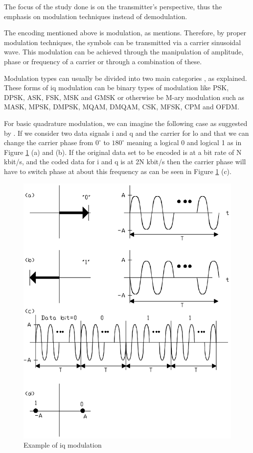 \par The focus of the study done is on the transmitter's perspective, thus the emphasis on modulation techniques instead of demodulation.

\par The encoding mentioned above is modulation, as \cite{Ha2010TheorySystems} mentions. Therefore, by proper modulation techniques, the symbols can be transmitted via a carrier sinusoidal wave. This modulation can be achieved through the manipulation of amplitude, phase or frequency of a carrier or through a combination of these.

\par Modulation types can usually be divided into two main categories \cite{Ha2010TheorySystems}, as explained. These forms of \ac{iq} modulation can be binary types of modulation like PSK, DPSK, ASK, FSK, MSK and GMSK or otherwise be M-ary modulation such as MASK, MPSK, DMPSK, MQAM, DMQAM, CSK, MFSK, CPM and OFDM.

\par For basic quadrature modulation, we can imagine the following case as suggested by \cite{Hanzo2011QuadratureEdition}. If we consider two data signals \ac{i} and \ac{q} and the carrier for \ac{lo} and that we can change the carrier phase from $0^{\circ}$ to $180^{\circ}$ meaning a logical 0 and logical 1 as in Figure \ref{fig:ch2_secMod_fig1} (a) and (b). If the original data set to be encoded is at a bit rate of N kbit/s, and the coded data for \ac{i} and \ac{q} is at 2N kbit/s then the carrier phase will have to switch phase at about this frequency as can be seen in Figure \ref{fig:ch2_secMod_fig1} (c).

\begin{figure}[H]
    \vspace*{0cm}
    \centering
    \includegraphics[width=0.55\linewidth]{figs/ch2_secMod_fig1.png}
    \caption{Example of \ac{iq} modulation \cite{Ha2010TheorySystems}}
    \label{fig:ch2_secMod_fig1}
\end{figure}

